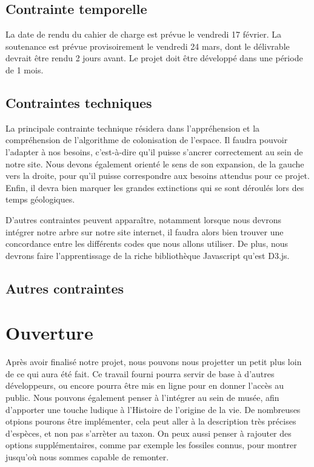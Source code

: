 \documentclass[a4paper]{article}
\begin{document}
{	\subsection{Contrainte temporelle}
		La date de rendu du cahier de charge est prévue le vendredi 17 février.
		La soutenance est prévue provisoirement le vendredi 24 mars, dont le délivrable devrait être rendu 2 jours avant.
		Le projet doit être développé dans une période de 1 mois.

	\subsection{Contraintes techniques}
		La principale contrainte technique résidera dans l'appréhension et la compréhension de l'algorithme de colonisation de l'espace. Il faudra pouvoir l'adapter à nos besoins, c'est-à-dire qu'il puisse s'ancrer correctement au sein de notre site. Nous devons également orienté le sens de son expansion, de la gauche vers la droite, pour qu'il puisse correspondre aux besoins attendus pour ce projet. Enfin, il devra bien marquer les grandes extinctions qui se sont déroulés lors des temps géologiques.

		D'autres contraintes peuvent apparaître, notamment lorsque nous devrons intégrer notre arbre sur notre site internet, il faudra alors bien trouver une concordance entre les différents codes que nous allons utiliser. De plus, nous devrons faire l'apprentissage de la riche bibliothèque Javascript qu'est D3.js.
		

	\subsection{Autres contraintes}

\section{Ouverture}

	Après avoir finalisé notre projet, nous pouvons nous projetter un petit plus loin de ce qui aura été fait. Ce travail fourni pourra servir de base à d'autres développeurs, ou encore pourra être mis en ligne pour en donner l'accès au public. Nous pouvons également penser à l'intégrer au sein de musée, afin d'apporter une touche ludique à l'Histoire de l'origine de la vie.
	De nombreuses otpions pourons être implémenter, cela peut aller à la description très précises d'espèces, et non pas s'arrèter au taxon. On peux aussi penser à rajouter des options supplémentaires, comme par exemple les fossiles connus, pour montrer jusqu'où nous sommes capable de remonter.


}
\end{document}
